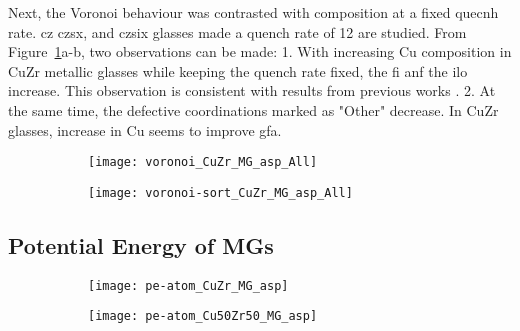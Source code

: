 Next, the Voronoi behaviour was contrasted with composition at a fixed quecnh rate. cz czsx, and czsix glasses made a quench rate of 12 are studied. From Figure~\ref{f:voro_comp}a-b, two observations can be made: 1. With increasing Cu composition in CuZr metallic glasses while keeping the quench rate fixed, the \gls{fi} anf the ilo increase. This observation is consistent with results from previous works \cite{Peng2010}. 2. At the same time, the defective coordinations marked as "Other" decrease. In CuZr glasses, increase in Cu seems to improve \gls{gfa}.

\begin{selfcite}
\begin{figure}[!ht]
	\centering
	\begin{subfigure}{0.45\linewidth} \centering \texttt{[image: voronoi\_CuZr\_MG\_asp\_All]} 
		\subcaption{} \end{subfigure}%
	\begin{subfigure}{0.45\linewidth} \centering \texttt{[image: voronoi-sort\_CuZr\_MG\_asp\_All]} 
		\subcaption{} \end{subfigure}%
	\label{f:voro_comp}
\end{figure}
\end{selfcite}

\subsection{Potential Energy of MGs}  \label{s:pe-mgs}
\begin{figure}[!ht]
	\centering
	\begin{subfigure}{\linewidth} \centering
	\texttt{[image: pe-atom\_CuZr\_MG\_asp]}
	\end{subfigure}%
	\vfill
	\begin{subfigure}{\linewidth} \centering
	\texttt{[image: pe-atom\_Cu50Zr50\_MG\_asp]}
	\end{subfigure}	
	\label{f:pe_mgs}
\end{figure}

